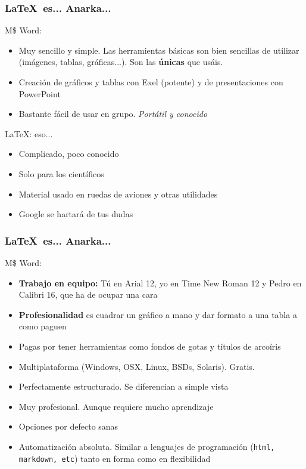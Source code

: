 \documentclass{beamer}
\begin{document}
\begin{frame}
\frametitle{\LaTeX\ es... Anarka...}
M\$ Word:
\begin{itemize}
	\item Muy sencillo y simple. Las herramientas básicas son bien sencillas de utilizar (imágenes, tablas, gráficas...). Son las \textbf{únicas} que usáis.
	\item Creación de gráficos y tablas con Exel (potente) y de presentaciones con PowerPoint
	\item Bastante fácil de usar en grupo. \textit{Portátil y conocido}
\end{itemize}
\LaTeX: eso...
\begin{itemize}
	\item Complicado, poco conocido
	\item Solo para los científicos
	\item Material usado en ruedas de aviones y otras utilidades
	\item Google se hartará de tus dudas
\end{itemize}
\end{frame}

\begin{frame}
\frametitle{\LaTeX\ es... Anarka...}
M\$ Word:
\begin{itemize}
	\item \textbf{Trabajo en equipo:} Tú en Arial 12, yo en Time New Roman 12 y Pedro en Calibri 16, que ha de ocupar una cara
	\item \textbf{Profesionalidad} es cuadrar un gráfico a mano y dar formato a una tabla a como paguen
	\item Pagas por tener herramientas como fondos de gotas y títulos de arcoíris
\end{itemize}
\LaTeXe
\begin{itemize}
	\item Multiplataforma (Windows, OSX, Linux, BSDs, Solaris). Gratis.
	\item Perfectamente estructurado. Se diferencian a simple vista
	\item Muy profesional. Aunque requiere mucho aprendizaje
	\item Opciones por defecto sanas
	\item Automatización absoluta. Similar a lenguajes de programación (\texttt{html, markdown, etc}) tanto en forma como en flexibilidad
\end{itemize}
\end{frame}

\end{document}
